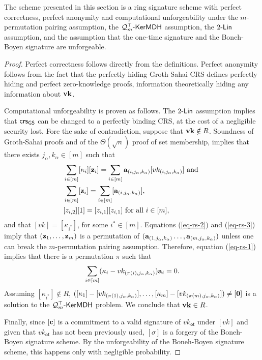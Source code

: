 \begin{theorem}
The scheme presented in this section is a ring signature scheme
with perfect correctness, perfect anonymity and computational unforgeability under the
$m$-permutation pairing assumption, the $\mathcal{Q}_m^\top\mbox{-}\mathsf{KerMDH}$ assumption, the $2\mbox{-}\mathsf{Lin}$ assumption, and the assumption
that the one-time signature and the Boneh-Boyen signature are unforgeable.
\end{theorem}
\begin{proof}
Perfect correctness follows directly from the definitions. Perfect anonymity follows from the fact that the perfectly hiding Groth-Sahai CRS defines perfectly hiding and perfect zero-knowledge proofs, information theoretically hiding any information about $\mathbf{vk}$.

Computational unforgeability is proven as follows. The $2\mbox{-}\mathsf{Lin}$ assumption implies that $\mathsf{crs}_{\mathsf{GS}}$ can be changed to a perfectly binding CRS, at the cost of a negligible security lost. Fore the sake of contradiction, suppose that $\mathbf{vk}\notin R$. Soundness of Groth-Sahai proofs and of the $\Theta(\sqrt{n})$ proof of set membership, implies that there exists $j_\alpha,k_\alpha\in[m]$ such that
\begin{align}
&\sum_{i\in[m]}[\kappa_i][\mathbf{z}_i]=\sum_{i\in[m]}\mathbf{a}_{(i,j_\alpha,k_\alpha)}[vk_{(i,j_\alpha,k_\alpha)}]\text{ and }\label{eq-rs-1}\\
&\sum_{i\in[m]}[\mathbf{z}_i]=\sum_{i\in[m]}[\mathbf{a}_{(i,j_\alpha,k_\alpha)}], \label{eq-rs-2}\\
&[z_{i,2}][1]=[z_{i,1}][z_{i,1}] \text{ for all }i\in[m],\label{eq-rs-3}
\end{align}
and that $[vk]=[\kappa_{i^*}]$, for some $i^*\in[m]$. Equations (\ref{eq-rs-2}) and (\ref{eq-rs-3}) imply that $(\mathbf{z}_1,\ldots,\mathbf{z}_m)$ is a permutation of $(\mathbf{a}_{(1,j_\alpha,k_\alpha)}\ldots,\mathbf{a}_{(m,j_\alpha,k_\alpha)})$ unless one can break the $m$-permutation pairing assumption. Therefore, equation (\ref{eq-rs-1}) implies that there is a permutation $\pi$ such that
\begin{align}
\sum_{i\in[m]}(\kappa_i-vk_{(\pi(i),j_\alpha,k_\alpha)})\mathbf{a}_i=0.
\end{align}
Assuming $[\kappa_{i^*}]\notin R$, $([\kappa_1]-[vk_{(\pi(1),j_\alpha,k_\alpha)}],\ldots,[\kappa_m]-[vk_{(\pi(m),j_\alpha,k_\alpha)}])\neq [\mathbf{0}]$ is a solution to the $\mathcal{Q}_m^\top\mbox{-}\mathsf{KerMDH}$ problem. We conclude that $\mathbf{vk}\in R$.

Finally, since $[\mathbf{c}]$ is a commitment to a valid signature of $vk_\mathsf{ot}$ under $[vk]$ and given that $vk_\mathsf{ot}$ has not been previously used, $[\sigma]$ is a forgery of the Boneh-Boyen signature scheme. By the unforgeability of the Boneh-Boyen signature scheme, this happens only with negligible probability.
\end{proof}
